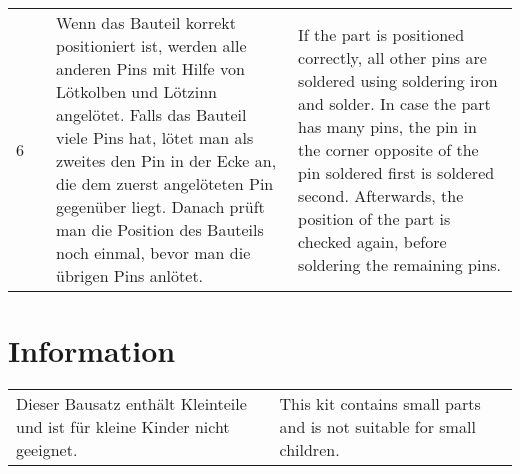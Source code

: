 \documentclass[a4paper]{article}
\newcommand{\vtopimage}[2]{
  \setlength\fboxsep{1pt}
  \setlength\fboxrule{0pt}
  \fbox{\texttt{[image: \#2]}}
}
\newcommand{\partimage}[1]{\vtopimage{.1\textwidth}{#1}}
\newcommand{\partsymbol}[1]{\partimage{symbols/#1.pdf}}
\begin{document}
\begin{tabular}{rm{}m{}m{}}
  \\
  6 & \partsymbol{smd_solder_done} &
    Wenn das Bauteil korrekt positioniert ist, werden alle anderen Pins mit
    Hilfe von Lötkolben und Lötzinn angelötet.
    Falls das Bauteil viele Pins hat, lötet man als zweites den
    Pin in der Ecke an, die dem zuerst angelöteten Pin gegenüber liegt.
    Danach prüft man die Position des Bauteils noch einmal,
    bevor man die übrigen Pins anlötet. &
    If the part is positioned correctly, all other pins are soldered using
    soldering iron and solder.
    In case the part has many pins, the pin in the corner opposite of the
    pin soldered first is soldered second.
    Afterwards, the position of the part is checked again,
    before soldering the remaining pins. \newline \\
\end{tabular}

\section{Information}

\begin{tabular}{m{}m{}}
  Dieser Bausatz enthält Kleinteile und ist für kleine Kinder nicht geeignet. &
  This kit contains small parts and is not suitable for small children. \\
\end{tabular}

\end{document}
